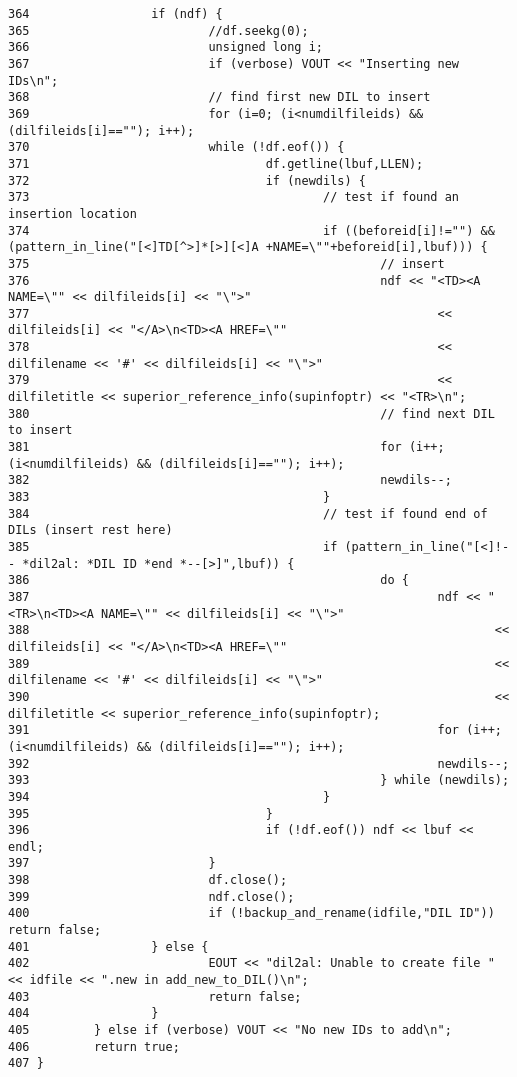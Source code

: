 \begin{verbatim}
364                 if (ndf) {
365                         //df.seekg(0);
366                         unsigned long i;
367                         if (verbose) VOUT << "Inserting new IDs\n";
368                         // find first new DIL to insert
369                         for (i=0; (i<numdilfileids) && (dilfileids[i]==""); i++);
370                         while (!df.eof()) {
371                                 df.getline(lbuf,LLEN);
372                                 if (newdils) {
373                                         // test if found an insertion location
374                                         if ((beforeid[i]!="") && (pattern_in_line("[<]TD[^>]*[>][<]A +NAME=\""+beforeid[i],lbuf))) {
375                                                 // insert
376                                                 ndf << "<TD><A NAME=\"" << dilfileids[i] << "\">"
377                                                         << dilfileids[i] << "</A>\n<TD><A HREF=\""
378                                                         << dilfilename << '#' << dilfileids[i] << "\">"
379                                                         << dilfiletitle << superior_reference_info(supinfoptr) << "<TR>\n";
380                                                 // find next DIL to insert
381                                                 for (i++; (i<numdilfileids) && (dilfileids[i]==""); i++);
382                                                 newdils--;
383                                         }
384                                         // test if found end of DILs (insert rest here)
385                                         if (pattern_in_line("[<]!-- *dil2al: *DIL ID *end *--[>]",lbuf)) {
386                                                 do {
387                                                         ndf << "<TR>\n<TD><A NAME=\"" << dilfileids[i] << "\">"
388                                                                 << dilfileids[i] << "</A>\n<TD><A HREF=\""
389                                                                 << dilfilename << '#' << dilfileids[i] << "\">"
390                                                                 << dilfiletitle << superior_reference_info(supinfoptr);
391                                                         for (i++; (i<numdilfileids) && (dilfileids[i]==""); i++);
392                                                         newdils--;
393                                                 } while (newdils);
394                                         }
395                                 }
396                                 if (!df.eof()) ndf << lbuf << endl;
397                         }
398                         df.close();
399                         ndf.close();
400                         if (!backup_and_rename(idfile,"DIL ID")) return false;
401                 } else {
402                         EOUT << "dil2al: Unable to create file " << idfile << ".new in add_new_to_DIL()\n";
403                         return false;
404                 }
405         } else if (verbose) VOUT << "No new IDs to add\n";
406         return true;
407 }
\end{verbatim}\normalsize 
